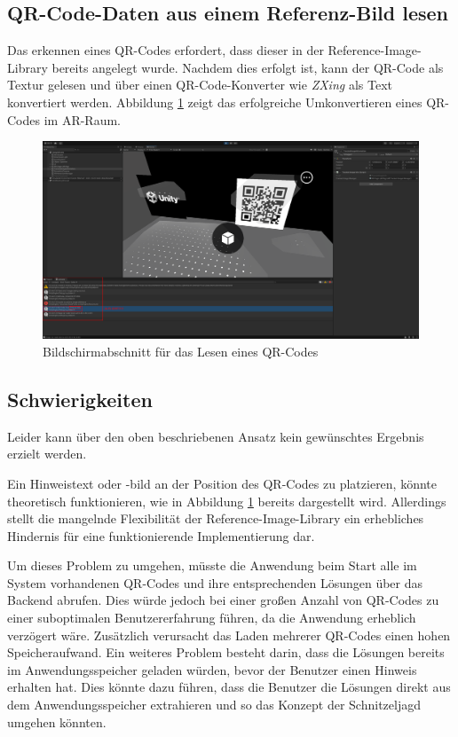 \subsection{QR-Code-Daten aus einem Referenz-Bild lesen}

Das erkennen eines QR-Codes erfordert, dass dieser in der Reference-Image-Library bereits angelegt wurde. Nachdem dies erfolgt ist, kann der QR-Code als Textur gelesen und über einen QR-Code-Konverter wie \textit{ZXing} als Text konvertiert werden. Abbildung \ref{fig:implementierung:unity:AR-Read-Qr-Img} zeigt das erfolgreiche Umkonvertieren eines QR-Codes im AR-Raum.

\begin{figure}[H]
    \centering
    \includegraphics[width=\textwidth]{images/PrAr_UnityAR-Read-Qr-Img.png}
    \caption{Bildschirmabschnitt für das Lesen eines QR-Codes}
    \label{fig:implementierung:unity:AR-Read-Qr-Img}
\end{figure}

\subsection{Schwierigkeiten}

Leider kann über den oben beschriebenen Ansatz kein gewünschtes Ergebnis erzielt werden.

Ein Hinweistext oder -bild an der Position des QR-Codes zu platzieren, könnte theoretisch funktionieren, wie in Abbildung \ref{fig:implementierung:unity:AR-Read-Qr-Img} bereits dargestellt wird. Allerdings stellt die mangelnde Flexibilität der Reference-Image-Library ein erhebliches Hindernis für eine funktionierende Implementierung dar.

Um dieses Problem zu umgehen, müsste die Anwendung beim Start alle im System vorhandenen QR-Codes und ihre entsprechenden Lösungen über das Backend abrufen. Dies würde jedoch bei einer großen Anzahl von QR-Codes zu einer suboptimalen Benutzererfahrung führen, da die Anwendung erheblich verzögert wäre. Zusätzlich verursacht das Laden mehrerer QR-Codes einen hohen Speicheraufwand. Ein weiteres Problem besteht darin, dass die Lösungen bereits im Anwendungsspeicher geladen würden, bevor der Benutzer einen Hinweis erhalten hat. Dies könnte dazu führen, dass die Benutzer die Lösungen direkt aus dem Anwendungsspeicher extrahieren und so das Konzept der Schnitzeljagd umgehen könnten.

